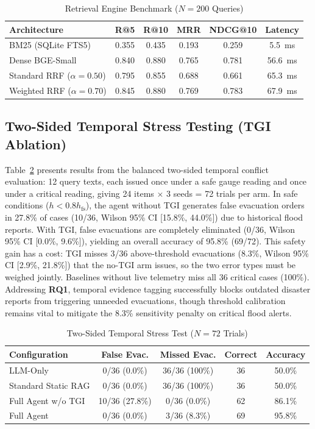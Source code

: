 \documentclass[conference]{IEEEtran}
\begin{document}
\begin{table}[h]
\caption{Retrieval Engine Benchmark ($N=200$ Queries)}
\label{tab:retrieval}
\centering
\scriptsize
\setlength{\tabcolsep}{2pt}
\begin{tabular*}{\columnwidth}{@{\extracolsep{\fill}}lccccc@{}}
\toprule
Architecture & R@5 & R@10 & MRR & NDCG@10 & Latency \\
\midrule
BM25 (SQLite FTS5) & 0.355 & 0.435 & 0.193 & 0.259 & 5.5~ms \\
Dense BGE-Small & 0.840 & 0.880 & 0.765 & 0.781 & 56.6~ms \\
Standard RRF ($\alpha=0.50$) & 0.795 & 0.855 & 0.688 & 0.661 & 65.3~ms \\
\midrule
Weighted RRF ($\alpha=0.70$) & 0.845 & 0.880 & 0.769 & 0.783 & 67.9~ms \\
\bottomrule
\end{tabular*}
\end{table}

\subsection{Two-Sided Temporal Stress Testing (TGI Ablation)}
Table~\ref{tab:tgi} presents results from the balanced two-sided temporal conflict evaluation: 12 query texts, each issued once under a safe gauge reading and once under a critical reading, giving 24 items $\times$ 3 seeds = 72 trials per arm. In safe conditions ($h < 0.8 h_{\mathrm{fs}}$), the agent without TGI generates false evacuation orders in 27.8\% of cases (10/36, Wilson 95\% CI [15.8\%, 44.0\%]) due to historical flood reports. With TGI, false evacuations are completely eliminated (0/36, Wilson 95\% CI [0.0\%, 9.6\%]), yielding an overall accuracy of 95.8\% (69/72). This safety gain has a cost: TGI misses 3/36 above-threshold evacuations (8.3\%, Wilson 95\% CI [2.9\%, 21.8\%]) that the no-TGI arm issues, so the two error types must be weighed jointly. Baselines without live telemetry miss all 36 critical cases (100\%). Addressing \textbf{RQ1}, temporal evidence tagging successfully blocks outdated disaster reports from triggering unneeded evacuations, though threshold calibration remains vital to mitigate the 8.3\% sensitivity penalty on critical flood alerts.

\begin{table}[h]
\caption{Two-Sided Temporal Stress Test ($N=72$ Trials)}
\label{tab:tgi}
\centering
\scriptsize
\setlength{\tabcolsep}{2pt}
\begin{tabular*}{\columnwidth}{@{\extracolsep{\fill}}lcccc@{}}
\toprule
Configuration & False Evac. & Missed Evac. & Correct & Accuracy \\
\midrule
LLM-Only & 0/36 (0.0\%) & 36/36 (100\%) & 36 & 50.0\% \\
Standard Static RAG & 0/36 (0.0\%) & 36/36 (100\%) & 36 & 50.0\% \\
Full Agent w/o TGI & 10/36 (27.8\%) & 0/36 (0.0\%) & 62 & 86.1\% \\
Full Agent & 0/36 (0.0\%) & 3/36 (8.3\%) & 69 & 95.8\% \\
\bottomrule
\end{tabular*}
\end{table}
\end{document}
